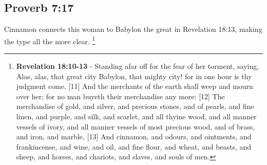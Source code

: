 \subsection{Proverb 7:17}
Cinnamon connects this woman to Babylon the great in Revelation 18:13, making the type all the more clear. \footnote{\textbf{Revelation 18:10-13} - Standing afar off for the fear of her torment, saying, Alas, alas, that great city Babylon, that mighty city! for in one hour is thy judgment come. [11] And the merchants of the earth shall weep and mourn over her; for no man buyeth their merchandise any more: [12] The merchandise of gold, and silver, and precious stones, and of pearls, and fine linen, and purple, and silk, and scarlet, and all thyine wood, and all manner vessels of ivory, and all manner vessels of most precious wood, and of brass, and iron, and marble, [13] And cinnamon, and odours, and ointments, and frankincense, and wine, and oil, and fine flour, and wheat, and beasts, and sheep, and horses, and chariots, and slaves, and souls of men.}